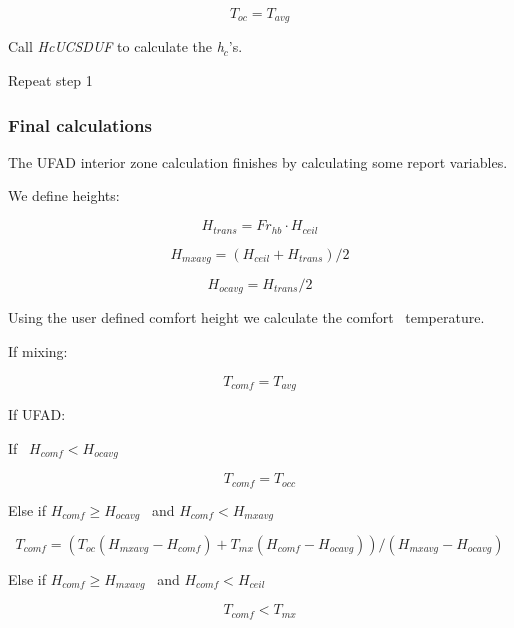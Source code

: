\begin{equation}
{T_{oc}} = {T_{avg}}
\end{equation}

Call \emph{HcUCSDUF} to calculate the \emph{h\(_{c}\)}'s.

Repeat step 1

\subsubsection{Final calculations}\label{final-calculations-1}

The UFAD interior zone calculation finishes by calculating some report variables.

We define heights:

\begin{equation}
{H_{trans}} = F{r_{hb}} \cdot {H_{ceil}}
\end{equation}

\begin{equation}
{H_{mxavg}} = \left( {{H_{ceil}} + {H_{trans}}} \right)/2
\end{equation}

\begin{equation}
{H_{ocavg}} = {H_{trans}}/2
\end{equation}

Using the user defined comfort height we calculate the comfort~ temperature.

If mixing:

\begin{equation}
{T_{comf}} = {T_{avg}}
\end{equation}

If UFAD:

If~ \({H_{comf}} < {H_{ocavg}}\)

\begin{equation}
{T_{comf}} = {T_{occ}}
\end{equation}

Else if \({H_{comf}} \ge {H_{ocavg}}\) ~and \({H_{comf}} < {H_{mxavg}}\)

\begin{equation}
{T_{comf}} = \left( {{T_{oc}}\left( {{H_{mxavg}} - {H_{comf}}} \right) + {T_{mx}}\left( {{H_{comf}} - {H_{ocavg}}} \right)} \right)/\left( {{H_{mxavg}} - {H_{ocavg}}} \right)
\end{equation}

Else if \({H_{comf}} \ge {H_{mxavg}}\) ~and \({H_{comf}} < {H_{ceil}}\)

\begin{equation}
{T_{comf}} < {T_{mx}}
\end{equation}

